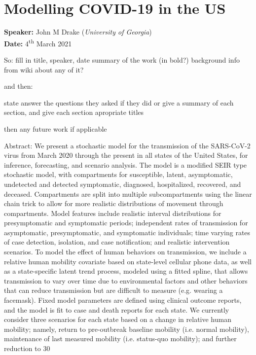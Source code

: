 \section{Modelling COVID-19 in the US}

\textbf{Speaker:} John M Drake (\textit{University of Georgia})\\
\textbf{Date:} \hspace{.53cm} 4\textsuperscript{th} March 2021
\vspace{.5cm}


So:
fill in title, speaker, date
summary of the work (in bold?)
background info from wiki about any of it?

and then:

state answer the questions they asked if they did
or give a summary of each section, and give each section apropriate titles

then any future work if applicable




Abstract: We present a stochastic model for the transmission of the SARS-CoV-2 virus from March 2020 through the present in all states of the United States, for inference, forecasting, and scenario analysis. The model is a modified SEIR type stochastic model, with compartments for susceptible, latent, asymptomatic, undetected and detected symptomatic, diagnosed, hospitalized, recovered, and deceased. Compartments are split into multiple subcompartments using the linear chain trick to allow for more realistic distributions of movement through compartments. Model features include realistic interval distributions for presymptomatic and symptomatic periods; independent rates of transmission for asymptomatic, presymptomatic, and symptomatic individuals; time varying rates of case detection, isolation, and case notification; and realistic intervention scenarios. To model the effect of human behaviors on transmission, we include a relative human mobility covariate based on state-level cellular phone data, as well as a state-specific latent trend process, modeled using a fitted spline, that allows transmission to vary over time due to environmental factors and other behaviors that can reduce transmission but are difficult to measure (e.g. wearing a facemask). Fixed model parameters are defined using clinical outcome reports, and the model is fit to case and death reports for each state. We currently consider three scenarios for each state based on a change in relative human mobility; namely, return to pre-outbreak baseline mobility (i.e. normal mobility), maintenance of last measured mobility (i.e. status-quo mobility); and further reduction to 30%


